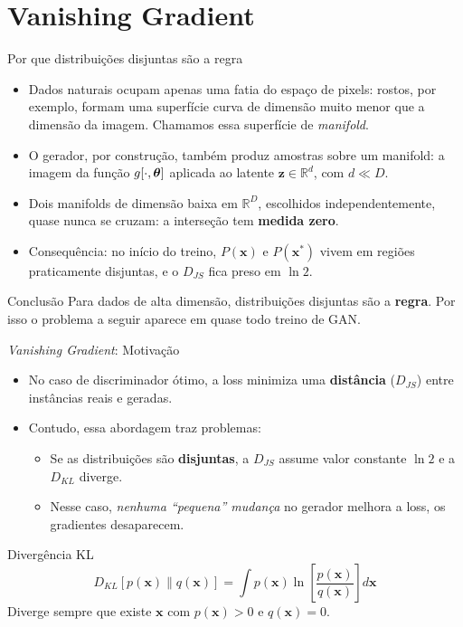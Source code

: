 \documentclass[aspectratio=169,xcolor=dvipsnames]{beamer}
\begin{document}
  \section{Vanishing Gradient}

  \begin{frame}{Por que distribuições disjuntas são a regra}
    \begin{itemize}
      \item Dados naturais ocupam apenas uma fatia do espaço de
      pixels: rostos, por exemplo, formam uma superfície curva de
      dimensão muito menor que a dimensão da imagem. Chamamos essa
      superfície de \emph{manifold}.
      \item O gerador, por construção, também produz amostras sobre um
      manifold: a imagem da função $g[\cdot,\bm{\theta}]$ aplicada ao
      latente $\mathbf{z} \in \mathbb{R}^{d}$, com $d \ll D$.
      \item Dois manifolds de dimensão baixa em $\mathbb{R}^{D}$,
      escolhidos independentemente, quase nunca se cruzam: a interseção
      tem \textbf{medida zero}.
      \item Consequência: no início do treino, $P(\mathbf{x})$ e $P(\mathbf{x}^{*})$ vivem
      em regiões praticamente disjuntas, e o $D_{JS}$ fica preso em
      $\ln 2$.
    \end{itemize}
    \begin{alertblock}{Conclusão}
      Para dados de alta dimensão, distribuições disjuntas são a
      \textbf{regra}. Por isso o problema a seguir aparece em quase todo
      treino de GAN.
    \end{alertblock}
  \end{frame}

  \begin{frame}{\textit{Vanishing Gradient}: Motivação}
    \begin{itemize}
      \item No caso de discriminador ótimo, a loss minimiza
      uma \textbf{distância} ($D_{JS}$) entre instâncias reais e
      geradas.
      \item Contudo, essa abordagem traz problemas:
      \begin{itemize}
        \item Se as distribuições são \textbf{disjuntas}, a $D_{JS}$
        assume valor constante $\ln 2$ e a $D_{KL}$ diverge.
        \item Nesse caso, \emph{nenhuma ``pequena'' mudança} no gerador
        melhora a loss, os gradientes desaparecem.
      \end{itemize}
    \end{itemize}
    \begin{block}{Divergência KL}
      \[
        D_{KL}[p(\mathbf{x})\|q(\mathbf{x})] = \int p(\mathbf{x})\ln\!\left[\frac{p(\mathbf{x})}{q(\mathbf{x})}\right] d\mathbf{x}
      \]
      Diverge sempre que existe $\mathbf{x}$ com $p(\mathbf{x})>0$ e $q(\mathbf{x})=0$.
    \end{block}
  \end{frame}
\end{document}

